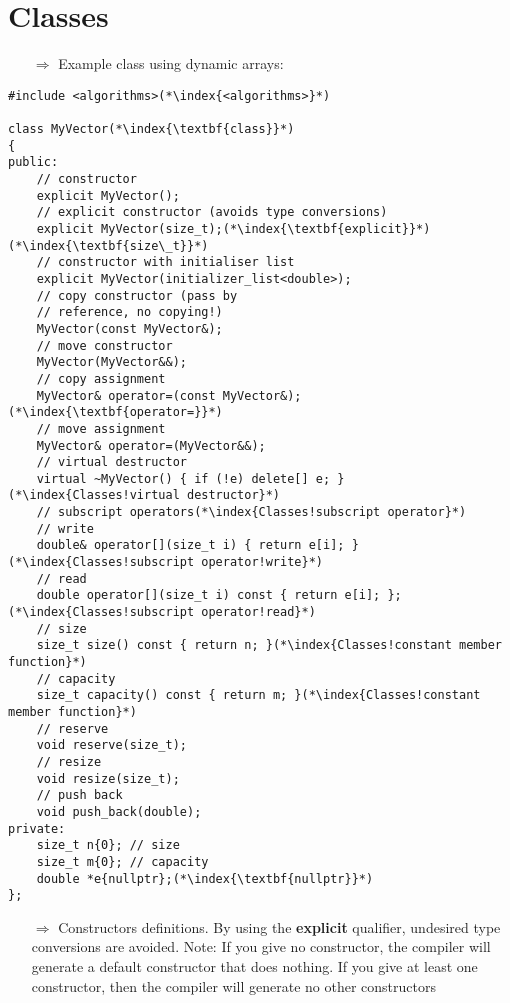 \documentclass[10pt]{article}
\begin{document}
\section{Classes}
\small
\begin{enumerate}
\item[$\Rightarrow$] Example class using dynamic arrays:
\end{enumerate}
\begin{lstlisting}
#include <algorithms>(*\index{<algorithms>}*)

class MyVector(*\index{\textbf{class}}*)
{
public:
    // constructor
    explicit MyVector();
    // explicit constructor (avoids type conversions)
    explicit MyVector(size_t);(*\index{\textbf{explicit}}*)(*\index{\textbf{size\_t}}*)
    // constructor with initialiser list
    explicit MyVector(initializer_list<double>);
    // copy constructor (pass by
    // reference, no copying!)
    MyVector(const MyVector&);
    // move constructor
    MyVector(MyVector&&);
    // copy assignment
    MyVector& operator=(const MyVector&);(*\index{\textbf{operator=}}*)
    // move assignment
    MyVector& operator=(MyVector&&);
    // virtual destructor
    virtual ~MyVector() { if (!e) delete[] e; }(*\index{Classes!virtual destructor}*)
    // subscript operators(*\index{Classes!subscript operator}*)
    // write
    double& operator[](size_t i) { return e[i]; }(*\index{Classes!subscript operator!write}*)
    // read
    double operator[](size_t i) const { return e[i]; };(*\index{Classes!subscript operator!read}*)
    // size
    size_t size() const { return n; }(*\index{Classes!constant member function}*)
    // capacity
    size_t capacity() const { return m; }(*\index{Classes!constant member function}*)
    // reserve
    void reserve(size_t);
    // resize
    void resize(size_t);
    // push back
    void push_back(double);
private:
    size_t n{0}; // size
    size_t m{0}; // capacity
    double *e{nullptr};(*\index{\textbf{nullptr}}*)
};
\end{lstlisting}
\begin{enumerate}
\item[$\Rightarrow$] Constructors definitions. By using the \textbf{explicit} qualifier, undesired type conversions are avoided. Note: If you give no constructor, the compiler will generate a default constructor that does nothing.
If you give at least one constructor, then the compiler will generate no other constructors
\end{enumerate}
\end{document}
